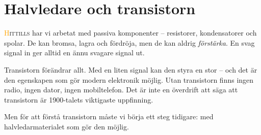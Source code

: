 \documentclass[a4paper,11pt,twoside]{book}
\begin{document}
\section{Halvledare och transistorn}

\lettrine[lines=2]{\textcolor{orange}{H}}{ittills} har vi arbetat med passiva komponenter -- resistorer,
kondensatorer och spolar. De kan bromsa, lagra och fördröja, men
de kan aldrig \emph{förstärka}. En svag signal in ger alltid en
ännu svagare signal ut.

Transistorn förändrar allt. Med en liten signal kan den styra
en stor -- och det är den egenskapen som gör modern elektronik
möjlig. Utan transistorn finns ingen radio, ingen dator, ingen
mobiltelefon. Det är inte en överdrift att säga att transistorn
är 1900-talets viktigaste uppfinning.

Men för att förstå transistorn måste vi börja ett steg tidigare:
med halvledarmaterialet som gör den möjlig.


\usetikzlibrary{arrows.meta, positioning, shapes.geometric, calc}



\end{document}
